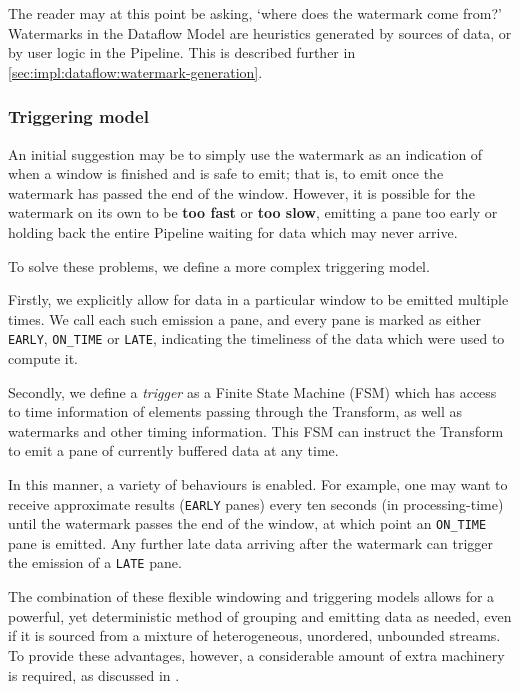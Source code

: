 The reader may at this point be asking, `where does the watermark come from?'
Watermarks in the Dataflow Model are heuristics generated by sources of data, or by user logic in the Pipeline.
This is described further in \cref{sec:impl:dataflow:watermark-generation}.

\subsubsection{Triggering model}

An initial suggestion may be to simply use the watermark as an indication of when a window is finished and is safe to emit; that is, to emit once the watermark has passed the end of the window.
However, it is possible for the watermark on its own to be \textbf{too fast} or \textbf{too slow}, emitting a pane too early or holding back the entire Pipeline waiting for data which may never arrive.

To solve these problems, we define a more complex triggering model.

Firstly, we explicitly allow for data in a particular window to be emitted multiple times.
We call each such emission a pane, and every pane is marked as either \verb|EARLY|, \verb|ON_TIME| or \verb|LATE|, indicating the timeliness of the data which were used to compute it.

Secondly, we define a \emph{trigger} as a Finite State Machine (FSM) which has access to time information of elements passing through the Transform, as well as watermarks and other timing information.
This FSM can instruct the Transform to emit a pane of currently buffered data at any time.

In this manner, a variety of behaviours is enabled.
For example, one may want to receive approximate results (\verb|EARLY| panes) every ten seconds (in processing-time) until the watermark passes the end of the window, at which point an \verb|ON_TIME| pane is emitted.
Any further late data arriving after the watermark can trigger the emission of a \verb|LATE| pane.

The combination of these flexible windowing and triggering models allows for a powerful, yet deterministic method of grouping and emitting data as needed, even if it is sourced from a mixture of heterogeneous, unordered, unbounded streams.
To provide these advantages, however, a considerable amount of extra machinery is required, as discussed in .

